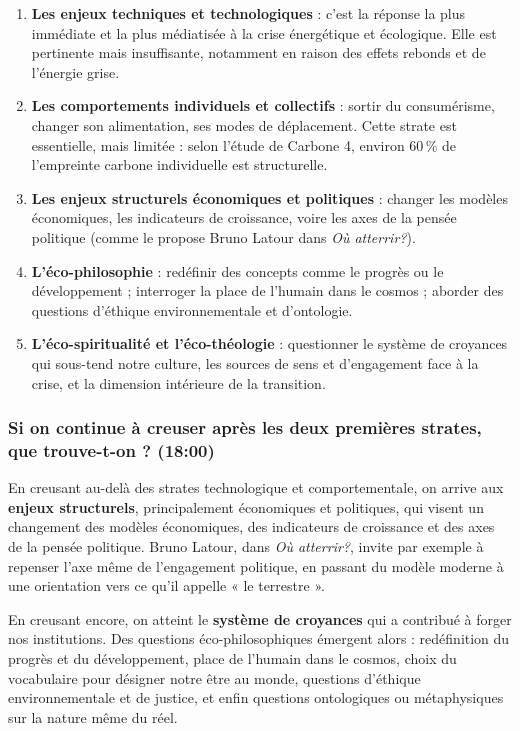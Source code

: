 \begin{enumerate}
    \item \textbf{Les enjeux techniques et technologiques} : c'est la réponse la plus immédiate et la plus médiatisée à la crise énergétique et écologique. Elle est pertinente mais insuffisante, notamment en raison des effets rebonds et de l'énergie grise.
    \item \textbf{Les comportements individuels et collectifs} : sortir du consumérisme, changer son alimentation, ses modes de déplacement. Cette strate est essentielle, mais limitée : selon l'étude de Carbone 4, environ 60\,\% de l'empreinte carbone individuelle est structurelle.
    \item \textbf{Les enjeux structurels économiques et politiques} : changer les modèles économiques, les indicateurs de croissance, voire les axes de la pensée politique (comme le propose Bruno Latour dans \textit{Où atterrir?}).
    \item \textbf{L'éco-philosophie} : redéfinir des concepts comme le progrès ou le développement ; interroger la place de l'humain dans le cosmos ; aborder des questions d'éthique environnementale et d'ontologie.
    \item \textbf{L'éco-spiritualité et l'éco-théologie} : questionner le système de croyances qui sous-tend notre culture, les sources de sens et d'engagement face à la crise, et la dimension intérieure de la transition.
\end{enumerate}

\subsubsection{Si on continue à creuser après les deux premières strates, que trouve-t-on ? \textnormal{\small(18:00)}}

En creusant au-delà des strates technologique et comportementale, on arrive aux \textbf{enjeux structurels}, principalement économiques et politiques, qui visent un changement des modèles économiques, des indicateurs de croissance et des axes de la pensée politique. Bruno Latour, dans \textit{Où atterrir?}, invite par exemple à repenser l'axe même de l'engagement politique, en passant du modèle moderne à une orientation vers ce qu'il appelle « le terrestre ».

En creusant encore, on atteint le \textbf{système de croyances} qui a contribué à forger nos institutions. Des questions éco-philosophiques émergent alors : redéfinition du progrès et du développement, place de l'humain dans le cosmos, choix du vocabulaire pour désigner notre être au monde, questions d'éthique environnementale et de justice, et enfin questions ontologiques ou métaphysiques sur la nature même du réel.

